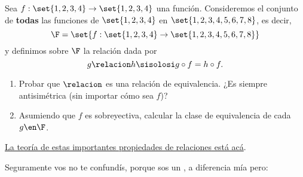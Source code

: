 \begin{enunciado}{\ejercicio}
  Sea $f: \set{1,2,3,4} \to \set{1,2,3,4}$ una función.
  Consideremos el conjunto de \textbf{todas} las funciones de $\set{1,2,3,4}$ en $\set{1,2,3,4,5,6,7,8}$, es decir,
  $$
    \F = \set{f: \set{1,2,3,4} \to \set{1,2,3,4,5,6,7,8}}
  $$
  y definimos sobre $\F$ la relación dada por
  $$
    g \relacion h \sisolosi g \circ f = h\circ f.
  $$

  \begin{enumerate}[label=\roman*)]
    \item Probar  que $\relacion$ es una relación de equivalencia. ¿Es siempre antisimétrica (sin importar cómo sea $f$)?

    \item Asumiendo que $f$ es sobreyectiva, calcular la clase de equivalencia de cada $g \en \F$.
  \end{enumerate}
\end{enunciado}

\hyperlink{teoria-1:relaciones}{La teoría de estas importantes propiedades de relaciones está acá}.

Seguramente vos no te confundís, porque sos un {}, a diferencia mía pero:


